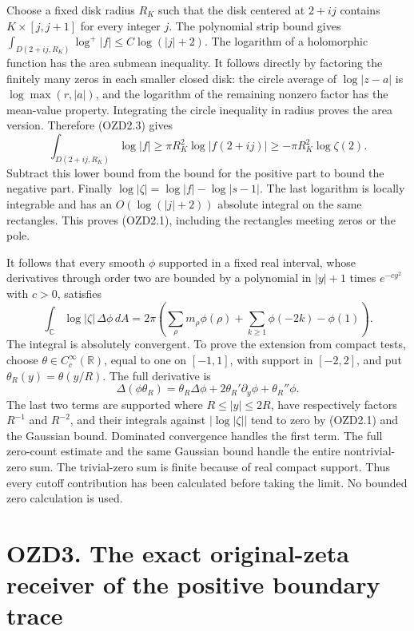 Choose a fixed disk radius \(R_K\) such that the disk centered at
\(2+ij\) contains \(K\times[j,j+1]\) for every integer \(j\). The
polynomial strip bound gives
\(\int_{D(2+ij,R_K)}\log^+|f|\le C\log(|j|+2)\). The logarithm of a
holomorphic function has the area submean inequality. It follows
directly by factoring the finitely many zeros in each smaller closed
disk: the circle average of \(\log|z-a|\) is \(\log\max(r,|a|)\), and
the logarithm of the remaining nonzero factor has the mean-value
property. Integrating the circle inequality in radius proves the area
version. Therefore (OZD2.3) gives \[
\int_{D(2+ij,R_K)}\log|f|\ge
\pi R_K^2\log|f(2+ij)|\ge-\pi R_K^2\log\zeta(2).
\] Subtract this lower bound from the bound for the positive part to
bound the negative part. Finally \(\log|\zeta|=\log|f|-\log|s-1|\). The
last logarithm is locally integrable and has an \(O(\log(|j|+2))\)
absolute integral on the same rectangles. This proves (OZD2.1),
including the rectangles meeting zeros or the pole.

It follows that every smooth \(\phi\) supported in a fixed real
interval, whose derivatives through order two are bounded by a
polynomial in \(|y|+1\) times \(e^{-c y^2}\) with \(c>0\), satisfies \[
\int_{\mathbb C}\log|\zeta|\,\Delta\phi\,dA
=2\pi\left(\sum_\rho m_\rho\phi(\rho)
+\sum_{k\ge1}\phi(-2k)-\phi(1)\right).
\tag{OZD2.4}
\] The integral is absolutely convergent. To prove the extension from
compact tests, choose \(\theta\in C_c^\infty(\mathbb R)\), equal to one
on \([-1,1]\), with support in \([-2,2]\), and put
\(\theta_R(y)=\theta(y/R)\). The full derivative is \[
\Delta(\phi\theta_R)=\theta_R\Delta\phi
+2\theta_R'\partial_y\phi+\theta_R''\phi.
\tag{OZD2.5}
\] The last two terms are supported where \(R\le|y|\le2R\), have
respectively factors \(R^{-1}\) and \(R^{-2}\), and their integrals
against \(|\log|\zeta||\) tend to zero by (OZD2.1) and the Gaussian
bound. Dominated convergence handles the first term. The full zero-count
estimate and the same Gaussian bound handle the entire nontrivial-zero
sum. The trivial-zero sum is finite because of real compact support.
Thus every cutoff contribution has been calculated before taking the
limit. No bounded zero calculation is used.

\section{OZD3. The exact original-zeta receiver of the positive boundary
trace}\label{ozd3.-the-exact-original-zeta-receiver-of-the-positive-boundary-trace}

